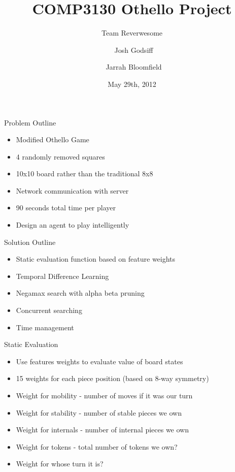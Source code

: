\documentclass{beamer}
\title[Team Reverwesome: Othello Bot] %
{COMP3130 Othello Project}
\subtitle
{Team Reverwesome} %
\author[Josh Godsiff, Jarrah Bloomfield] %
{~Josh Godsiff \and ~Jarrah Bloomfield}
\date[Short Occasion] %
{May 29th, 2012}
\begin{document}
\begin{frame}
  \titlepage
\end{frame}

\begin{frame}{Problem Outline}
    \begin{itemize}
  \item
    Modified Othello Game
  \item
    4 randomly removed squares
  \item
    10x10 board rather than the traditional 8x8
  \item
    Network communication with server
  \item
    90 seconds total time per player
  \item
    Design an agent to play intelligently
  \end{itemize}
\end{frame}

\begin{frame}{Solution Outline}
    \begin{itemize}
  \item
    Static evaluation function based on feature weights
  \item
    Temporal Difference Learning
  \item
    Negamax search with alpha beta pruning
  \item
    Concurrent searching
  \item
    Time management
  \end{itemize}
\end{frame}

\begin{frame}{Static Evaluation}
    \begin{itemize}
  \item
    Use features weights to evaluate value of board states
  \item
    15 weights for each piece position (based on 8-way symmetry)
  \item
    Weight for mobility - number of moves if it was our turn
  \item
   Weight for stability - number of stable pieces we own
  \item
   Weight for internals - number of internal pieces we own
  \item
   Weight for tokens - total number of tokens we own?
  \item
   Weight for whose turn it is?
  \end{itemize}
\end{frame}
\end{document}

